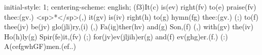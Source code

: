 initial-style: 1;
centering-scheme: english;
(f3)It(c) is(ev) right(fv) to(e) praise(fv) thee:(gv.) <sp>*</sp>(,) it(gv) is(iv) right(h) to(g) hymn(fg) thee:(gv.) (;) to(f) thee(jv) be(jv) glo(jli)ry,(i) (,) Fa(ig)ther(hv) and(g) Son,(f) (,) with(gv) the(iv) Ho(h)ly(g) Spir(fe)it,(fv) (;) for(jv)ev(jljih)er(g) and(f) ev(ghg)er.(f.) (:) A(cefgwhGF)men.(ef..)
